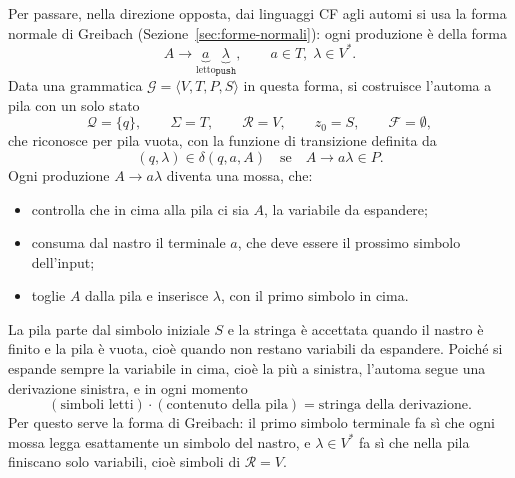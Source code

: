 \documentclass[a4paper, 11pt, oneside]{book}
\theoremstyle{formale}
\begin{document}
    Per passare, nella direzione opposta, dai linguaggi CF agli automi si usa la forma
    normale di Greibach (Sezione~\ref{sec:forme-normali}): ogni produzione \`e della
    forma
    \begin{equation*}
        A \to \underbrace{a}_{\text{letto}} \underbrace{\lambda}_{\texttt{push}},
        \qquad a \in T,\; \lambda \in V^*.
    \end{equation*}
    Data una grammatica $\mathcal{G} = \langle V, T, P, S \rangle$ in questa forma, si
    costruisce l'automa a pila con un solo stato
    \begin{equation*}
        \mathcal{Q} = \{q\}, \qquad \Sigma = T, \qquad \mathcal{R} = V, \qquad
        z_0 = S, \qquad \mathcal{F} = \emptyset,
    \end{equation*}
    che riconosce per pila vuota, con la funzione di transizione definita da
    \begin{equation*}
        (q, \lambda) \in \delta(q, a, A) \quad \text{se} \quad A \to a\lambda \in P.
    \end{equation*}
    Ogni produzione $A \to a\lambda$ diventa una mossa, che:
    \begin{itemize}
        \item controlla che in cima alla pila ci sia $A$, la variabile da espandere;
        \item consuma dal nastro il terminale $a$, che deve essere il prossimo simbolo
            dell'input;
        \item toglie $A$ dalla pila e inserisce $\lambda$, con il primo simbolo in cima.
    \end{itemize}
    La pila parte dal simbolo iniziale $S$ e la stringa \`e accettata quando il nastro \`e
    finito e la pila \`e vuota, cio\`e quando non restano variabili da espandere. Poich\'e
    si espande sempre la variabile in cima, cio\`e la pi\`u a sinistra, l'automa segue
    una derivazione sinistra, e in ogni momento
    \begin{equation*}
        (\text{simboli letti}) \cdot (\text{contenuto della pila})
        = \text{stringa della derivazione}.
    \end{equation*}
    Per questo serve la forma di Greibach: il primo simbolo terminale fa s\`i che ogni
    mossa legga esattamente un simbolo del nastro, e $\lambda \in V^*$ fa s\`i che nella
    pila finiscano solo variabili, cio\`e simboli di $\mathcal{R} = V$.
\end{document}

